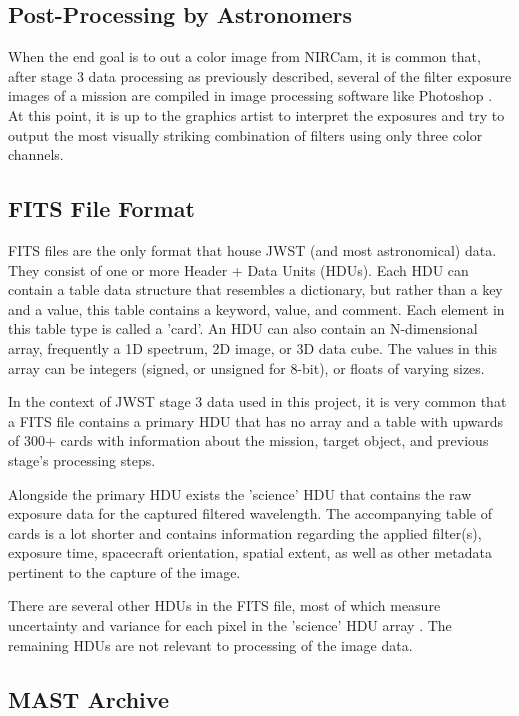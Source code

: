 \documentclass[10pt,twocolumn,letterpaper]{article}
\begin{document}
\subsection{Post-Processing by Astronomers}
When the end goal is to out a color image from NIRCam, it is common that, after stage 3 data processing as previously described, several of the filter exposure images of a mission are compiled in image processing software like Photoshop \cite{editinterview}. At this point, it is up to the graphics artist to interpret the exposures and try to output the most visually striking combination of filters using only three color channels.

\subsection{FITS File Format}
FITS files are the only format that house JWST (and most astronomical) data. They consist of one or more Header + Data Units (HDUs). 
Each HDU can contain a table data structure that resembles a dictionary, but rather than a key and a value, this table contains a keyword, value, and comment. Each element in this table type is called a 'card'. 
An HDU can also contain an N-dimensional array, frequently a 1D spectrum, 2D image, or 3D data cube. The values in this array can be integers (signed, or unsigned for 8-bit), or floats of varying sizes. \cite{fitsdoc}

In the context of JWST stage 3 data used in this project, it is very common that a FITS file contains a primary HDU that has no array and a table with upwards of 300+ cards with information about the mission, target object, and previous stage's processing steps.

Alongside the primary HDU exists the 'science' HDU that contains the raw exposure data for the captured filtered wavelength. The accompanying table of cards is a lot shorter and contains information regarding the applied filter(s), exposure time, spacecraft orientation, spatial extent, as well as other metadata pertinent to the capture of the image.

There are several other HDUs in the FITS file, most of which measure uncertainty and variance for each pixel in the 'science' HDU array \cite{webbfits}. The remaining HDUs are not relevant to processing of the image data. 

\subsection{MAST Archive}
\end{document}
